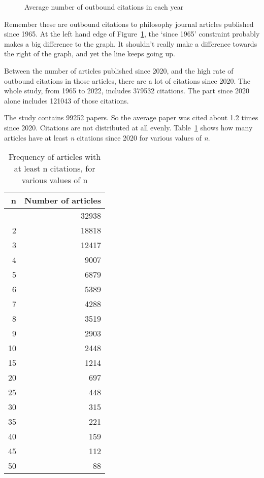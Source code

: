 \documentclass[
  10pt,
  letterpaper,
  DIV=11,
  numbers=noendperiod,
  twoside]{scrartcl}
\begin{document}
\begin{figure}


\caption{\label{fig-average-of-outbound-citations-by-year}Average number
of outbound citations in each year}

\end{figure}%

Remember these are outbound citations to philosophy journal articles
published since 1965. At the left hand edge of
Figure~\ref{fig-average-of-outbound-citations-by-year}, the `since 1965'
constraint probably makes a big difference to the graph. It shouldn't
really make a difference towards the right of the graph, and yet the
line keeps going up.

Between the number of articles published since 2020, and the high rate
of outbound citations in those articles, there are a lot of citations
since 2020. The whole study, from 1965 to 2022, includes 379532
citations. The part since 2020 alone includes 121043 of those citations.

The study contains 99252 papers. So the average paper was cited about
1.2 times since 2020. Citations are not distributed at all evenly.
Table~\ref{tbl-count-of-recent-citations} shows how many articles have
at least \emph{n} citations since 2020 for various values of \emph{n}.

\begin{longtable}[]{@{}rr@{}}

\caption{\label{tbl-count-of-recent-citations}Frequency of articles with
at least n citations, for various values of n}

\tabularnewline

\toprule\noalign{}
n & Number of articles \\
\midrule\noalign{}
\endhead
\bottomrule\noalign{}
\endlastfoot
1 & 32938 \\
2 & 18818 \\
3 & 12417 \\
4 & 9007 \\
5 & 6879 \\
6 & 5389 \\
7 & 4288 \\
8 & 3519 \\
9 & 2903 \\
10 & 2448 \\
15 & 1214 \\
20 & 697 \\
25 & 448 \\
30 & 315 \\
35 & 221 \\
40 & 159 \\
45 & 112 \\
50 & 88 \\

\end{longtable}
\end{document}
